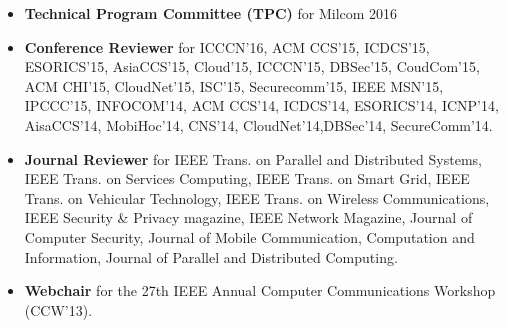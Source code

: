 \documentclass[letter]{article}
\newenvironment{tightitem}
{\begin{itemize}
\setlength{\itemsep}{1pt}
\setlength{\parskip}{0pt}
\setlength{\parsep}{0pt}}
{\end{itemize}}
\begin{document}
\begin{description}
\begin{itemize}
\item \textbf{Technical Program Committee (TPC)} for Milcom 2016

\item \textbf{Conference Reviewer} for ICCCN'16, ACM CCS'15, ICDCS'15, ESORICS'15, AsiaCCS'15, Cloud'15, ICCCN'15, DBSec'15, CoudCom'15, ACM CHI'15, CloudNet'15, ISC'15, Securecomm'15, IEEE MSN'15, IPCCC'15, INFOCOM'14, ACM CCS'14, ICDCS'14, ESORICS'14, ICNP'14, AisaCCS'14, MobiHoc'14, CNS'14, CloudNet'14,DBSec'14, SecureComm'14.
\item \textbf{Journal Reviewer} for IEEE Trans. on Parallel and Distributed Systems, IEEE Trans. on Services Computing, IEEE Trans. on Smart Grid, IEEE Trans. on Vehicular Technology, IEEE Trans. on Wireless Communications, IEEE Security \& Privacy magazine, IEEE Network Magazine, Journal of Computer Security, Journal of Mobile Communication, Computation and Information, Journal of Parallel and Distributed Computing.


\item \textbf{Webchair} for the 27th IEEE Annual Computer Communications Workshop (CCW'13).

\end{itemize}



\end{description}
\end{document}
